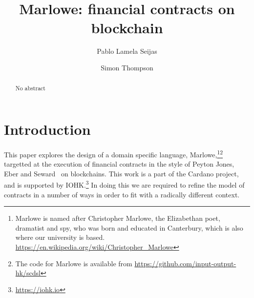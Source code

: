 \documentclass[
      acmsmall
    , screen
    , review=true
  ]{acmart}
\begin{document}
\title
  [Marlowe]
  {Marlowe: financial contracts on blockchain}

\author{Pablo Lamela Seijas}

\author{Simon Thompson}

\begin{abstract}
  No abstract
\end{abstract}



%
%


\maketitle


\section{Introduction}



This paper explores the design of a domain specific language, Marlowe,\footnote{Marlowe is named after Christopher Marlowe, the Elizabethan poet, dramatist and spy, who was born and educated in Canterbury, which is also where our university is based. \url{https://en.wikipedia.org/wiki/Christopher_Marlowe}}\footnote{The code for Marlowe is available from \url{https://github.com/input-output-hk/scdsl}
} targetted at the execution of financial contracts in the style of Peyton Jones, Eber and Seward~\cite{PeytonJones:2000} on blockchains. This work is a part of the Cardano project, and is supported by IOHK.\footnote{\url{https://iohk.io}}
In doing this we are required to refine the model of contracts in a number of ways in order to fit with a radically different context. 
\end{document}
